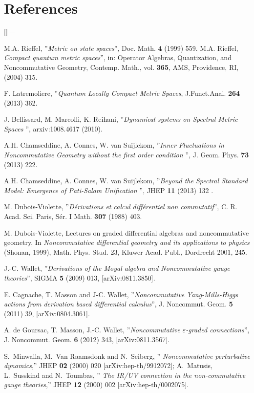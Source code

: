 \documentclass[a4paper]{jpconf}
\numberwithin{equation}{section}
\theoremstyle{nonumberplain}
\renewenvironment{thebibliography}[1]{%
\section*{References}%
\frenchspacing\small%
\begin{list}{[\arabic{enumi}]}%
{%
\usecounter{enumi}\parsep=2pt\topsep 0pt%
\settowidth{\labelwidth}{[#1]}%
\leftmargin=\labelwidth\advance\leftmargin\labelsep%
\rightmargin=0pt\itemsep=1pt\sloppy%
}%
}{\end{list}}
\begin{document}
\begin{thebibliography}{50}
 M.A. Rieffel, ''{\it{Metric on state spaces}}'', Doc. Math. {\bf{4}} (1999) 559. M.A. Rieffel, {\it{Compact quantum metric spaces}}'', in: Operator Algebras, Quantization, and Noncommutative Geometry, Contemp. Math., vol. {\bf{365}},
AMS, Providence, RI, (2004) 315.

 F. Latremoliere, ''{\it{Quantum Locally Compact Metric Spaces}}, J.Funct.Anal. {\bf{264}} (2013) 362. 

 J. Bellissard, M. Marcolli, K. Reihani, ''{\it{Dynamical systems on Spectral Metric Spaces }}'', arxiv:1008.4617 (2010).

 A.H. Chamseddine, A. Connes, W. van Suijlekom, ''{\it{Inner Fluctuations in Noncommutative Geometry without the first order condition }}'', J. Geom. Phys. {\bf{73}} (2013) 222.

 A.H. Chamseddine, A. Connes, W. van Suijlekom, ''{\it{Beyond the Spectral Standard Model: Emergence of Pati-Salam Unification }}'', JHEP {\bf{11}} (2013) 132 .

 M. Dubois-Violette, ''{\it{D\'erivations et calcul diff\'erentiel non commutatif}}'', C. R. Acad. Sci.
Paris, S\'er. I Math. {\bf{307}} (1988) 403.

 M. Dubois-Violette, Lectures on graded differential algebras and noncommutative geometry, In {\it{Noncommutative differential geometry and its applications to physics}} (Shonan, 1999), Math. Phys. Stud. 23, Kluwer Acad. Publ., Dordrecht 2001, 245.

 J.-C. Wallet, ''{\it{Derivations of the Moyal algebra and Noncommutative gauge theories}}'', SIGMA {\bf{5}} (2009) 013, [arXiv:0811.3850].

E. Cagnache, T. Masson and J-C. Wallet, ''{\it{Noncommutative Yang-Mills-Higgs actions from derivation based differential calculus}}'', J. Noncommut. Geom. {\bf{5}} (2011) 39, [arXiv:0804.3061].

A. de Goursac, T. Masson, J.-C. Wallet, ''{\it{Noncommutative $\varepsilon$-graded connections}}'', J. Noncommut. Geom. {\bf{6}} (2012) 343, [arXiv:0811.3567].

 S.~Minwalla, M.~Van Raamsdonk and N.~Seiberg, ''{\it{ Noncommutative perturbative dynamics}},''
  JHEP {\bf 02} (2000) 020 [arXiv:hep-th/9912072]; A.~Matusis, L.~Susskind and N.~Toumbas, ''{\it{ The IR/UV connection in the non-commutative gauge theories}},''
JHEP {\bf 12} (2000) 002 [arXiv:hep-th/0002075].



\end{thebibliography}
\end{document}
